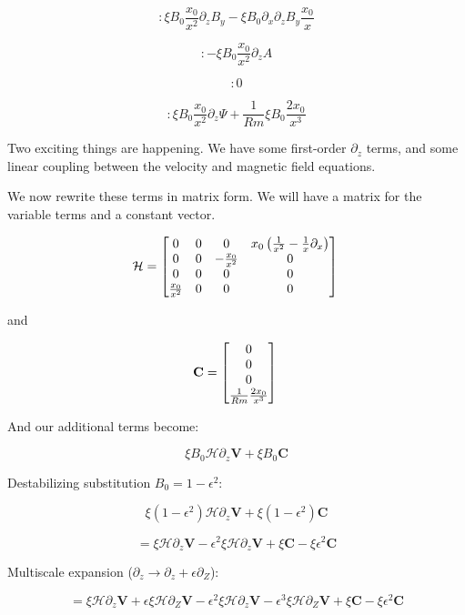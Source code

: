 \documentclass[letterpaper,12pt]{article}
\newcommand{\beq}{\begin{equation}}
\newcommand{\eeq}{\end{equation}}
\newcommand\reym{\mathrel{Rm}}
\begin{document}
\beq
[\Psi]: \xi B_0 \frac{x_0}{x^2} \partial_z B_{y} - \xi B_0 \partial_x\partial_z B_{y} \frac{x_0}{x}
\eeq

\beq
[u_y]: - \xi B_0 \frac{x_0}{x^2} \partial_z A
\eeq

\beq
[A]: 0
\eeq

\beq
[B]: \xi B_0 \frac{x_0}{x^2} \partial_z \Psi + \frac{1}{\reym} \xi B_0 \frac{2 x_0}{x^3}
\eeq

Two exciting things are happening. We have some first-order $\partial_z$ terms, and some linear coupling between the velocity and magnetic field equations.

We now rewrite these terms in matrix form. We will have a matrix for the variable terms and a constant vector.

\beq
\mathcal{H} = \left[ \begin{matrix}  0 & 0 & 0 & x_0\left(\frac{1}{x^2} - \frac{1}{x}\partial_x\right)\\
0 & 0 & -\frac{x_0}{x^2} & 0 \\ 
0 & 0 & 0 & 0 \\
\frac{x_0}{x^2} & 0 & 0 & 0 \\
\end{matrix} \right] \\
\eeq

and

\beq
\mathbf{C} = \left[\begin{matrix} 0 \\
0 \\
0 \\
\frac{1}{\reym} \frac{2 x_0}{x^3} \\
\end{matrix} \right] \\
\eeq

And our additional terms become:

\beq
\xi B_0 \mathcal{H} \partial_z \mathbf{V} + \xi B_0 \mathbf{C}
\eeq

Destabilizing substitution $B_0 = 1 - \epsilon^2$:

\beq
\xi \left(1 - \epsilon^2\right) \mathcal{H} \partial_z \mathbf{V} + \xi \left(1 - \epsilon^2\right) \mathbf{C}
\eeq

\beq
= \xi \mathcal{H} \partial_z \mathbf{V}  - \epsilon^2 \xi \mathcal{H} \partial_z \mathbf{V} + \xi \mathbf{C} - \xi \epsilon^2 \mathbf{C}
\eeq

Multiscale expansion ($\partial_z \rightarrow \partial_z + \epsilon \partial_Z$):

\beq
= \xi \mathcal{H} \partial_z \mathbf{V} + \epsilon \xi \mathcal{H} \partial_Z \mathbf{V} - \epsilon^2 \xi \mathcal{H} \partial_z \mathbf{V} - \epsilon^3 \xi \mathcal{H} \partial_Z \mathbf{V} + \xi \mathbf{C} - \xi \epsilon^2 \mathbf{C}
\eeq
\end{document}
